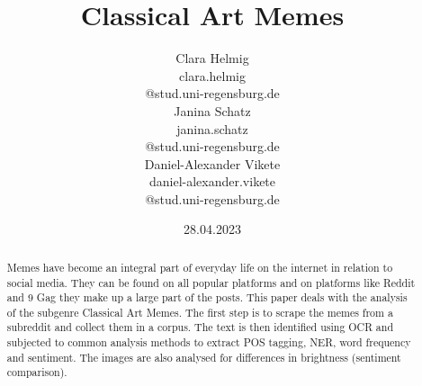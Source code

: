 \documentclass[11pt,a4paper]{article}
\title{Classical Art Memes}
\author
  {Clara Helmig\\
  {clara.helmig\\@stud.uni-regensburg.de} \\\And
  {Janina Schatz\\
  janina.schatz\\@stud.uni-regensburg.de}  \\\And
  {Daniel-Alexander Vikete \\
 { daniel-alexander.vikete\\@stud.uni-regensburg.de}
  }}
\date{28.04.2023}
\begin{document}
\maketitle
\begin{abstract}
Memes have become an integral part of everyday life on the internet in relation to social media. They can be found on all popular platforms and on platforms like Reddit and 9 Gag they make up a large part of the posts.
This paper deals with the analysis of the subgenre Classical Art Memes.
The first step is to scrape the memes from a subreddit and collect them in a corpus. The text is then identified using OCR and subjected to common analysis methods to extract POS tagging, NER, word frequency and sentiment. The images are also analysed for differences in brightness (sentiment comparison).
\end{abstract}
\end{document}
